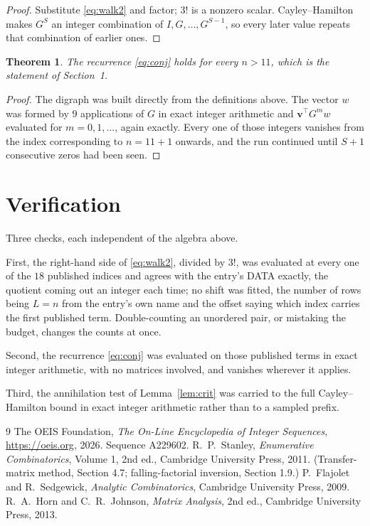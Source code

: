 \documentclass[11pt,a4paper]{article}
\theoremstyle{plain}
\newtheorem{theorem}{Theorem}
\theoremstyle{definition}
\begin{document}
\begin{proof}
Substitute \eqref{eq:walk2} and factor; $3!$ is a nonzero scalar. Cayley--Hamilton
makes $G^{S}$ an integer combination of $I,G,\dots,G^{S-1}$, so every later value repeats
that combination of earlier ones.
\end{proof}

\begin{theorem}
The recurrence \eqref{eq:conj} holds for every $n>11$, which is the statement of
Section~1.
\end{theorem}

\begin{proof}
The digraph was built directly from the definitions above. The vector $w$ was formed by
$9$ applications of $G$ in exact integer arithmetic and $\mathbf{v}^{\!\top}G^{m}w$
evaluated for $m=0,1,\dots$, again exactly. Every one of those integers vanishes from the
index corresponding to $n=11+1$ onwards, and the run continued until $S+1$ consecutive
zeros had been seen.
\end{proof}

\section{Verification}

Three checks, each independent of the algebra above.

First, the right-hand side of \eqref{eq:walk2}, divided by $3!$, was evaluated at every
one of the $18$ published indices and agrees with the entry's DATA exactly, the quotient
coming out an integer each time; no shift was fitted, the number of rows being $L=n$
from the entry's own name and the offset saying which index carries the first published term.
Double-counting an unordered pair, or mistaking the budget, changes the counts at once.

Second, the recurrence \eqref{eq:conj} was evaluated on those published terms in exact
integer arithmetic, with no matrices involved, and vanishes wherever it applies.

Third, the annihilation test of Lemma~\ref{lem:crit} was carried to the full
Cayley--Hamilton bound in exact integer arithmetic rather than to a sampled prefix.

\begin{thebibliography}{9}
 The OEIS Foundation, \emph{The On-Line Encyclopedia of Integer
Sequences}, \url{https://oeis.org}, 2026. Sequence A229602.
 R.~P.~Stanley, \emph{Enumerative Combinatorics}, Volume 1, 2nd ed.,
Cambridge University Press, 2011. (Transfer-matrix method, Section 4.7; falling-factorial
inversion, Section 1.9.)
 P.~Flajolet and R.~Sedgewick, \emph{Analytic Combinatorics}, Cambridge
University Press, 2009.
 R.~A.~Horn and C.~R.~Johnson, \emph{Matrix Analysis}, 2nd ed., Cambridge
University Press, 2013.
\end{thebibliography}
\end{document}
